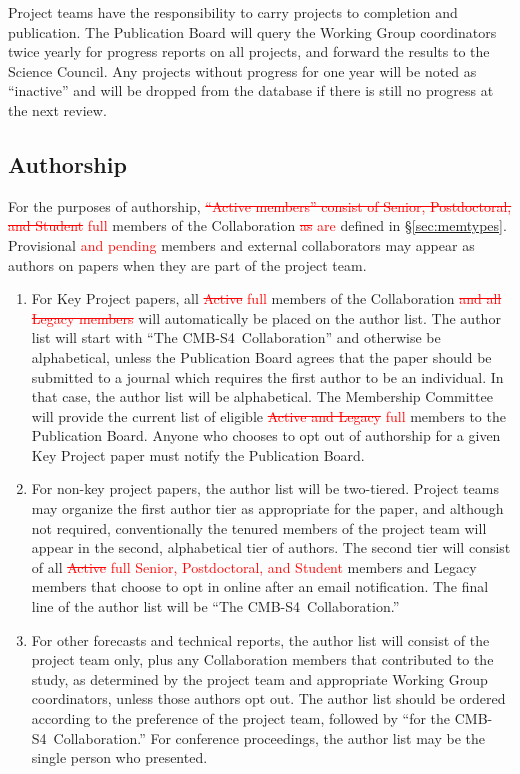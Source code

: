 \documentclass[12pt]{article}
\newcommand\collabname{CMB-S4}
\begin{document}
Project teams have the responsibility to carry projects to completion and publication.  The Publication Board will query the Working Group coordinators twice yearly for progress reports on all projects, and forward the results to the Science Council.  Any projects without progress for one year will be noted as ``inactive'' and will be dropped from the database if there is still no progress at the next review.

\subsection{Authorship}

For the purposes of authorship, \textcolor{red}{\sout{``Active members'' consist of Senior, Postdoctoral, and Student} full }members of the Collaboration  \textcolor{red}{\sout{as} are} defined in \S\ref{sec:memtypes}.  Provisional \textcolor{red}{and pending} members and external collaborators may appear as authors on papers when they are part of the project team.

\begin{enumerate}

\item For Key Project papers, all  \textcolor{red}{\sout{Active} full } members of the Collaboration  \textcolor{red}{\sout{and all Legacy members}} will automatically be placed on the author list.  The author list will start with ``The \collabname\ Collaboration'' and otherwise be alphabetical, unless the Publication Board agrees that the paper should be submitted to a journal which requires the first author to be an individual.  In that case, the author list will be alphabetical. The Membership Committee will provide the current list of eligible  \textcolor{red}{\sout{Active and Legacy} full } members to the Publication Board. Anyone who chooses to opt out of authorship for a given Key Project paper must  notify the Publication Board.

\item For non-key project papers, the author list will be two-tiered. Project teams may organize the first author tier as appropriate for the paper, and although not required, conventionally the tenured members of the project team will appear in the second, alphabetical tier of authors. The second tier will consist of all  \textcolor{red}{\sout{Active} full Senior, Postdoctoral, and Student} members and Legacy members that choose to opt in online after an email notification.  The final line of the author list will be ``The \collabname\ Collaboration.''

\item For other forecasts and technical reports, the author list will consist of the project team only, plus any Collaboration members that contributed to the study, as determined by the project team and appropriate Working Group coordinators, unless those authors opt out.  The author list should be ordered according to the preference of the project team, followed by ``for the \collabname\ Collaboration.''  For conference proceedings, the author list may be the single person who presented.

\end{enumerate}
\end{document}
